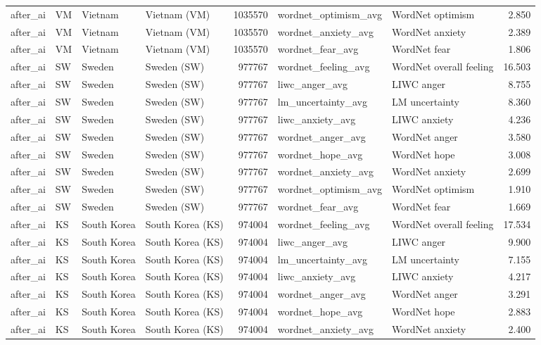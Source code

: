 \begin{tabular}{llllrllr}
after\_ai & VM & Vietnam & Vietnam (VM) & 1035570 & wordnet\_optimism\_avg & WordNet optimism & 2.850 \\
after\_ai & VM & Vietnam & Vietnam (VM) & 1035570 & wordnet\_anxiety\_avg & WordNet anxiety & 2.389 \\
after\_ai & VM & Vietnam & Vietnam (VM) & 1035570 & wordnet\_fear\_avg & WordNet fear & 1.806 \\
after\_ai & SW & Sweden & Sweden (SW) & 977767 & wordnet\_feeling\_avg & WordNet overall feeling & 16.503 \\
after\_ai & SW & Sweden & Sweden (SW) & 977767 & liwc\_anger\_avg & LIWC anger & 8.755 \\
after\_ai & SW & Sweden & Sweden (SW) & 977767 & lm\_uncertainty\_avg & LM uncertainty & 8.360 \\
after\_ai & SW & Sweden & Sweden (SW) & 977767 & liwc\_anxiety\_avg & LIWC anxiety & 4.236 \\
after\_ai & SW & Sweden & Sweden (SW) & 977767 & wordnet\_anger\_avg & WordNet anger & 3.580 \\
after\_ai & SW & Sweden & Sweden (SW) & 977767 & wordnet\_hope\_avg & WordNet hope & 3.008 \\
after\_ai & SW & Sweden & Sweden (SW) & 977767 & wordnet\_anxiety\_avg & WordNet anxiety & 2.699 \\
after\_ai & SW & Sweden & Sweden (SW) & 977767 & wordnet\_optimism\_avg & WordNet optimism & 1.910 \\
after\_ai & SW & Sweden & Sweden (SW) & 977767 & wordnet\_fear\_avg & WordNet fear & 1.669 \\
after\_ai & KS & South Korea & South Korea (KS) & 974004 & wordnet\_feeling\_avg & WordNet overall feeling & 17.534 \\
after\_ai & KS & South Korea & South Korea (KS) & 974004 & liwc\_anger\_avg & LIWC anger & 9.900 \\
after\_ai & KS & South Korea & South Korea (KS) & 974004 & lm\_uncertainty\_avg & LM uncertainty & 7.155 \\
after\_ai & KS & South Korea & South Korea (KS) & 974004 & liwc\_anxiety\_avg & LIWC anxiety & 4.217 \\
after\_ai & KS & South Korea & South Korea (KS) & 974004 & wordnet\_anger\_avg & WordNet anger & 3.291 \\
after\_ai & KS & South Korea & South Korea (KS) & 974004 & wordnet\_hope\_avg & WordNet hope & 2.883 \\
after\_ai & KS & South Korea & South Korea (KS) & 974004 & wordnet\_anxiety\_avg & WordNet anxiety & 2.400 \\

\end{tabular}

